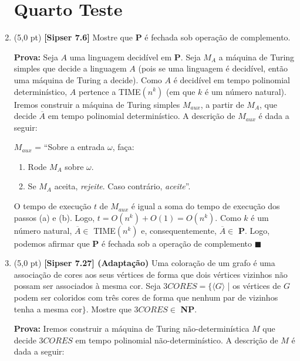\documentclass[12pt,a4paper,oneside]{article}
\begin{document}
\begin{enumerate}
	
	\section*{Quarto Teste}
	
	\item (5,0 pt) {\bf [Sipser 7.6]}  Mostre que {\bf P} é fechada sob operação de complemento.\\
	
	{\color{blue}
		{\bf Prova:} Seja $A$ uma linguagem decidível em {\bf P}. Seja $M_A$ a máquina de Turing simples que decide a linguagem $A$ (pois se uma linguagem é decidível, então uma máquina de Turing a decide). Como $A$ é decidível em tempo polinomial determinístico, $A$ pertence a {\sc TIME}$(n^k)$ (em que $k$ é um número natural).  Iremos construir a máquina de Turing simples $M_{aux}$, a partir de $M_A$, que decide $\overline{A}$ em tempo polinomial determinístico. A descrição de $M_{aux}$ é dada a seguir:
		
		$M_{aux}$ = ``Sobre a entrada $\omega$, faça:
		\begin{enumerate}
			\item Rode $M_A$ sobre $\omega$. 
			\item Se $M_A$ aceita, {\it rejeite}. Caso contrário, {\it aceite}''.
		\end{enumerate}
		
		O tempo de execução $t$ de $M_{aux}$ é igual a soma do tempo de execução dos passos (a) e (b). Logo, $t = O(n^k) + O(1) = O(n^k)$. Como $k$ é um número natural, $\overline{A} \in$ {\sc TIME}$(n^k)$ e, consequentemente, $\overline{A} \in$ {\bf P}. Logo, podemos afirmar que {\bf P} é fechada sob a operação de complemento $\blacksquare$
	}	
	
	\item (5,0 pt)  {\bf [Sipser 7.27] (Adaptação)}  Uma coloração de um grafo é uma associação de cores aos seus vértices de forma que dois vértices vizinhos não possam ser associados à mesma cor. Seja $3CORES = \{\langle G \rangle$ | os vértices de $G$ podem ser coloridos com três cores de forma que nenhum par de vizinhos tenha a mesma cor$\}$. Mostre que $3CORES \in$ {\bf NP}.\\
	
	{\color{blue}
		{\bf Prova:} Iremos construir a máquina de Turing não-determinística $M$ que decide $3CORES$ em tempo polinomial não-determinístico. A descrição de $M$ é dada a seguir:
		
}
\end{enumerate}
\end{document}
